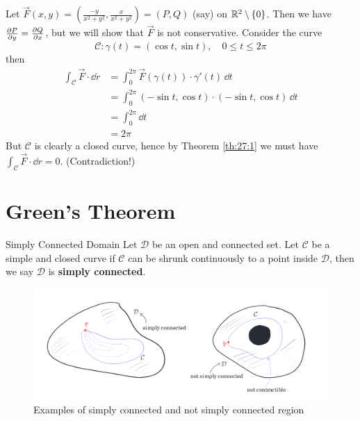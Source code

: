 \documentclass[../Analysis-3.tex]{subfiles}
\begin{document}
\begin{Eg}{}{}
  Let $\vec{F}(x,y) = \left( \frac{-y}{x^2+y^2}, \frac{x}{x^2+y^2} \right) = (P,Q)$ (say) on $\mathbb{R}^2 \setminus \{0\}$. Then we have $\pdv{P}{y} = \pdv{Q}{x}$, but we will show that $\vec{F}$ is not conservative. Consider the curve
  \[
    \mathcal{C} : \gamma(t) = ( \cos t, \sin t), \quad 0 \leq t \leq 2\pi
  \]
  then
  \begin{align*}
    \int_{\mathcal{C}} \vec{F} \cdot \dd r
     & = \int_0^{2\pi}  \vec{F}(\gamma(t))\cdot \gamma'(t) \, \dd t        \\
     & = \int_0^{2\pi}  (-\sin t, \cos t) \cdot (-\sin t, \cos t) \, \dd t \\
     & = \int_0^{2\pi} \dd t                                               \\
     & = 2\pi
  \end{align*}
  But $\mathcal{C}$ is clearly a closed curve, hence by Theorem \ref{th:27:1} we must have $\displaystyle\int_{\mathcal{C}} \vec{F} \cdot \dd r = 0$. (Contradiction!)
\end{Eg}

\section{Green's Theorem}

\begin{Def}{Simply Connected Domain}{}
  Let $\mathcal{D}$ be an open and connected set. Let $\mathcal{C}$ be a simple and closed curve if $\mathcal{C}$ can be shrunk continuously to a point inside $\mathcal{D}$, then we say $\mathcal{D}$ is \textbf{simply connected}.
\end{Def}

\begin{figure}[h]
  \centering
  \includegraphics[width=\textwidth]{../figures/lec27.4.png}
  \caption{Examples of simply connected and not simply connected region}
  \label{fig4:27}
\end{figure}
\end{document}
